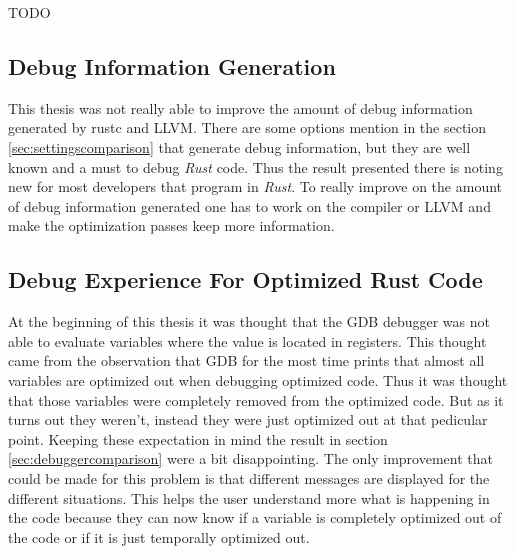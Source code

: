 

TODO


\subsection{Debug Information Generation}
This thesis was not really able to improve the amount of debug information generated by \gls{rustc} and \gls{LLVM}.
There are some options mention in the section \ref{sec:settingscomparison} that generate debug information, but they are well known and a must to debug \emph{Rust} code.
Thus the result presented there is noting new for most developers that program in \emph{Rust}.
To really improve on the amount of debug information generated one has to work on the compiler or \gls{LLVM} and make the optimization passes keep more information.


\subsection{Debug Experience For Optimized Rust Code}
At the beginning of this thesis it was thought that the \gls{GDB} debugger was not able to evaluate variables where the value is located in registers.
This thought came from the observation that \gls{GDB} for the most time prints that almost all variables are optimized out when debugging optimized code.
Thus it was thought that those variables were completely removed from the optimized code.
But as it turns out they weren't, instead they were just optimized out at that pedicular point.
Keeping these expectation in mind the result in section \ref{sec:debuggercomparison} were a bit disappointing.
The only improvement that could be made for this problem is that different messages are displayed for the different situations.
This helps the user understand more what is happening in the code because they can now know if a variable is completely optimized out of the code or if it is just temporally optimized out.


